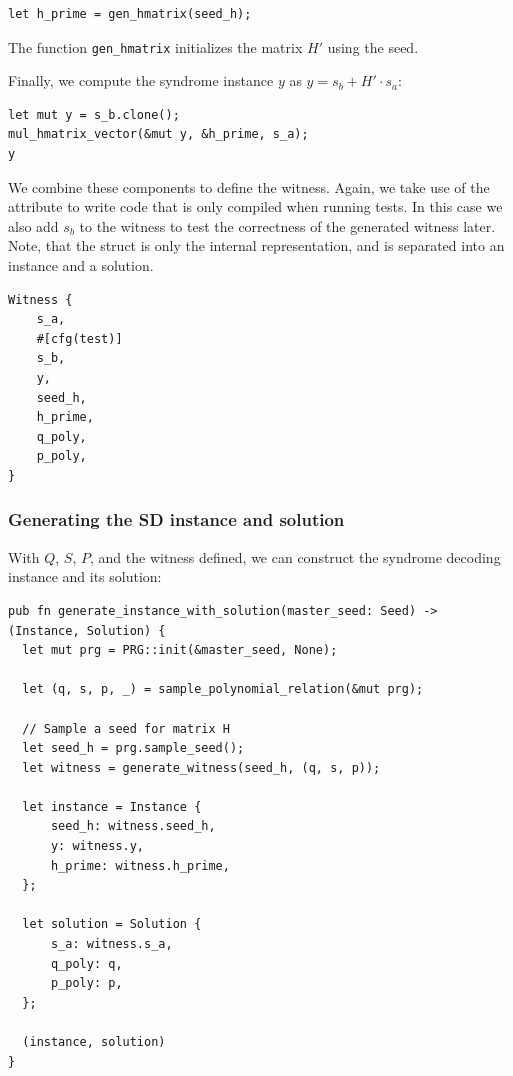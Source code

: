 \documentclass[11pt]{report}
\theoremstyle{definition}
\theoremstyle{plain}
\begin{document}
\begin{verbatim}
let h_prime = gen_hmatrix(seed_h);
\end{verbatim}

The function \texttt{gen\_hmatrix} initializes the matrix $H'$ using the seed.

Finally, we compute the syndrome instance $y$ as $y = s_b + H' \cdot s_a$:

\begin{verbatim}
let mut y = s_b.clone();
mul_hmatrix_vector(&mut y, &h_prime, s_a);
y
\end{verbatim}

We combine these components to define the witness. Again, we take use of the  attribute to write code that is only compiled when running tests. In this case we also add $s_b$ to the witness to test the correctness of the generated witness later. Note, that the  struct is only the internal representation, and is separated into an instance and a solution.

\begin{verbatim}
Witness {
    s_a,
    #[cfg(test)]
    s_b,
    y,
    seed_h,
    h_prime,
    q_poly,
    p_poly,
}
\end{verbatim}

\subsubsection{Generating the SD instance and solution}

With $Q$, $S$, $P$, and the witness defined, we can construct the syndrome decoding instance and its solution:

\begin{verbatim}
pub fn generate_instance_with_solution(master_seed: Seed) -> (Instance, Solution) {
  let mut prg = PRG::init(&master_seed, None);

  let (q, s, p, _) = sample_polynomial_relation(&mut prg);

  // Sample a seed for matrix H
  let seed_h = prg.sample_seed();
  let witness = generate_witness(seed_h, (q, s, p));

  let instance = Instance {
      seed_h: witness.seed_h,
      y: witness.y,
      h_prime: witness.h_prime,
  };

  let solution = Solution {
      s_a: witness.s_a,
      q_poly: q,
      p_poly: p,
  };

  (instance, solution)
}
\end{verbatim}
\end{document}
